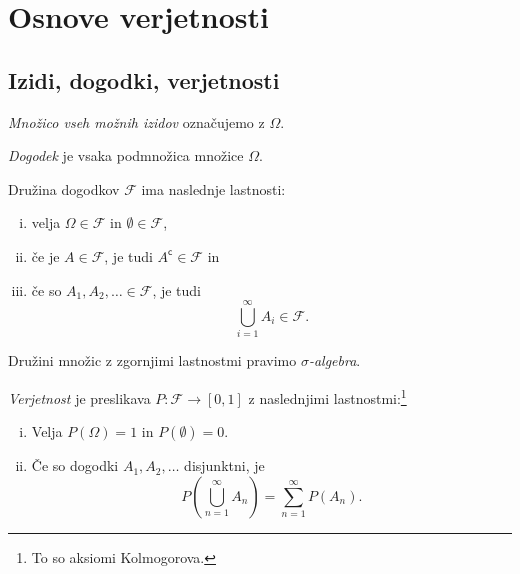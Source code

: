 \section{Osnove verjetnosti}

\subsection{Izidi, dogodki, verjetnosti}


\begin{definicija}
\emph{Množico vseh možnih izidov} označujemo
z $\Omega$.
\end{definicija}

\begin{definicija}
\emph{Dogodek} je vsaka podmnožica množice $\Omega$.
\end{definicija}

\begin{definicija}
Družina dogodkov $\mathcal{F}$ ima naslednje lastnosti:

\begin{enumerate}[i)]
\item velja $\Omega \in \mathcal{F}$ in
$\emptyset \in \mathcal{F}$,
\item če je $A \in \mathcal{F}$, je tudi
$A^\mathsf{c} \in \mathcal{F}$ in
\item če so $A_1, A_2, \ldots \in \mathcal{F}$, je tudi
\[
\bigcup_{i=1}^\infty A_i \in \mathcal{F}.
\]
\end{enumerate}

Družini množic z zgornjimi lastnostmi pravimo
\emph{$\sigma$-algebra}.
\end{definicija}

\begin{definicija}
\emph{Verjetnost} je preslikava
$P \colon \mathcal{F} \to [0,1]$ z naslednjimi
lastnostmi:\footnote{To so aksiomi Kolmogorova.}

\begin{enumerate}[i)]
\item Velja $P(\Omega) = 1$ in $P(\emptyset) = 0$.
\item Če so dogodki $A_1, A_2, \dots$ disjunktni, je
\[
P\left(\bigcup_{n=1}^\infty A_n\right) = \sum_{n=1}^\infty P(A_n).
\]
\end{enumerate}
\end{definicija}

